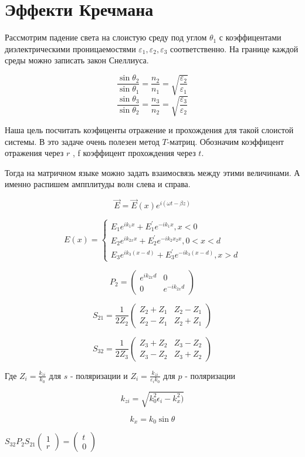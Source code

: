 \section{Эффекти Кречмана}

Рассмотрим падение света на слоистую среду под углом $ 
\theta_1 $ с коэффицентами  диэлектрическими проницаемостями $ \varepsilon_1, \varepsilon_2, \varepsilon_3 $ соответственно. 
На границе каждой среды можно записать закон Снеллиуса.

	$$
	\frac{\sin{\theta_2}}{\sin{\theta_1}} = \frac{n_2}{n_1} =\sqrt{\frac{\varepsilon_{2}}{\varepsilon_1}}	$$
	$$
	\frac{{\sin\theta_3}}{\sin{\theta_2}} = \frac{n_3}{n_2} =\sqrt{\frac{\varepsilon_{3}}{\varepsilon_2}}	
	$$

Наша цель посчитать коэфиценты отражение и прохождения для такой слоистой системы. В это задаче очень полезен метод $ T $-матриц. Обозначим коэффицент отражения через $ r $ , f коэффицент прохождения через $ t $.

Тогда на матричном языке можно задать взаимосвязь между этими величинами. А именно распишем ампплитуды волн слева и справа.

$$\vec{E}=\vec{E}(x) e^{i(\omega t-\beta z)}$$

$$E(x)=\left\{\begin{array}{c}
E_{1} e^{i k_{1} x}+E_{1}^{\prime} e^{-i k_{1} x}, x<0 \\
E_{2} e^{i k_{2 x} x}+E_{2}^{\prime} e^{-i k_{2} x_{2} x}, 0<x<d \\
E_{3} e^{i k_{3}(x-d)}+E_{3}^{\prime} e^{-i k_{3}(x-d)}, x>d
\end{array}\right.$$

$$P_{2}=\left(\begin{array}{cc}
e^{i k_{2 x} d} & 0 \\
0 & e^{-i k_{2 x} d}
\end{array}\right)$$



$$
S_{21} = 
\frac{1}{2 Z_2}\begin{pmatrix}
	Z_2+Z_1 & Z_2 -Z_1 \\
	Z_2-Z_1 & Z_2+Z_1
\end{pmatrix}
$$


$$
S_{32} = 
\frac{1}{2 Z_3}\begin{pmatrix}
Z_3+Z_2 & Z_3 -Z_2 \\
Z_3-Z_2 & Z_3+Z_2
\end{pmatrix}
$$

Где $Z_i = \frac{k_{zi}}{k_0}$ для $ s $ - поляризации и $Z_i = \frac{k_{zi}}{\varepsilon_i k_0}$ для $ p $ - поляризации 

$$
 k_{zi} = \sqrt{k_0^2 \epsilon_i - k_x^2)}
$$

$$
 k_{x} = k_0 \sin{ \theta}
$$


$
S_{32} P_2 S_{21} \begin{pmatrix}
	1\\
	r 
\end{pmatrix} = 
\begin{pmatrix}
t\\
0 
\end{pmatrix}
$
